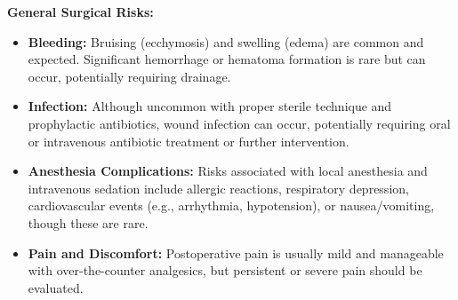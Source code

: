 \textbf{General Surgical Risks:}
\begin{itemize}
  \item \textbf{Bleeding:} Bruising (ecchymosis) and swelling (edema) are common and expected. Significant hemorrhage or hematoma formation is rare but can occur, potentially requiring drainage.

  \item \textbf{Infection:} Although uncommon with proper sterile technique and prophylactic antibiotics, wound infection can occur, potentially requiring oral or intravenous antibiotic treatment or further intervention.

  \item \textbf{Anesthesia Complications:} Risks associated with local anesthesia and intravenous sedation include allergic reactions, respiratory depression, cardiovascular events (e.g., arrhythmia, hypotension), or nausea/vomiting, though these are rare.

  \item \textbf{Pain and Discomfort:} Postoperative pain is usually mild and manageable with over-the-counter analgesics, but persistent or severe pain should be evaluated.
\end{itemize}

